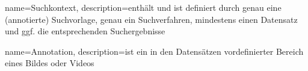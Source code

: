 {
name=Suchkontext,
description={enth\"alt und ist definiert durch genau eine (annotierte) Suchvorlage, genau ein Suchverfahren, mindestens einen Datensatz und ggf. die entsprechenden Suchergebnisse}
}

{
name=Annotation,
description={ist ein in den Datensätzen vordefinierter Bereich eines Bildes oder Videos}
}
